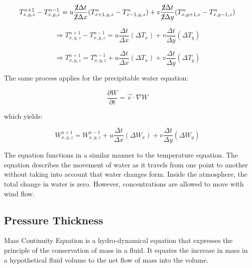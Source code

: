 \begin{equation}
    T^{n + 1}_{x, y, z} - T^{n - 1}_{x, y, z} = u \frac{\cancel{2} \Delta t}{\cancel{2} \Delta x} (T^{n}_{x+1, y, z} - T^{n}_{x-1, y, z}) + v \frac{\cancel{2} \Delta t}{\cancel{2} \Delta y} (T^{n}_{x, y+1, z} - T^{n}_{x, y-1, z})
\end{equation}

\begin{equation}
    \Rightarrow T^{n + 1}_{x, y, z} - T^{n - 1}_{x, y, z} = u \frac{\Delta t}{\Delta x} (\Delta T_{x})
    + v \frac{\Delta t}{\Delta y} (\Delta T_{y})
\end{equation}

\begin{equation}
    \Rightarrow T^{n + 1}_{x, y, z} = T^{n - 1}_{x, y, z} + u \frac{\Delta t}{\Delta x} (\Delta T_{x})
    + v \frac{\Delta t}{\Delta y} (\Delta T_{y})
\end{equation}

The same process applies for the precipitable water equation:

\begin{equation}
    \frac{\partial W}{\partial t} = \Vec{v} \cdot \nabla W
\end{equation}

which yields:

\begin{equation}
    W^{n + 1}_{x, y, z} = W^{n - 1}_{x, y, z} + u \frac{\Delta t}{\Delta x} (\Delta W_{x})
    + v \frac{\Delta t}{\Delta y} (\Delta W_{y})
\end{equation}

The equation functions in a similar manner to the temperature equation. The equation describes the movement of water as it travels from one point to another without taking into account that water changes form. Inside the atmosphere, the total change in water is zero. However, concentrations are allowed to move with wind flow\cite{primitive_equations}.

\subsection{Pressure Thickness}
\begin{definition}
Mass Continuity Equation is a hydro-dynamical equation that expresses the principle of the conservation of mass in a fluid. It equates the increase in mass in a hypothetical fluid volume to the net flow of mass into the volume.
\end{definition}

